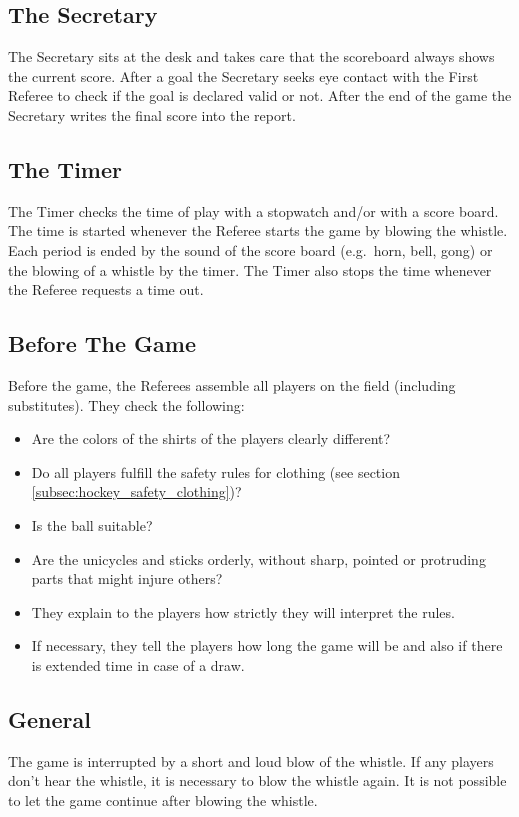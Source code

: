\subsection{The Secretary}
The Secretary sits at the desk and takes care that the scoreboard always shows the current score.
After a goal the Secretary seeks eye contact with the First Referee to check if the goal is declared valid or not.
After the end of the game the Secretary writes the final score into the report.

\subsection{The Timer}
The Timer checks the time of play with a stopwatch and/or with a score board.
The time is started whenever the Referee starts the game by blowing the whistle.
Each period is ended by the sound of the score board (e.g.\ horn, bell, gong) or the blowing of a whistle by the timer.
The Timer also stops the time whenever the Referee requests a time out.

\subsection{Before The Game}
Before the game, the Referees assemble all players on the field (including substitutes).
They check the following:
\begin{itemize}
\item Are the colors of the shirts of the players clearly different?
\item Do all players fulfill the safety rules for clothing (see section \ref{subsec:hockey_safety_clothing})?
\item Is the ball suitable?
\item Are the unicycles and sticks orderly, without sharp, pointed or protruding parts that might injure others?
\item They explain to the players how strictly they will interpret the rules.
\item If necessary, they tell the players how long the game will be and also if there is extended time in case of a draw.
\end{itemize}

\subsection{General}
The game is interrupted by a short and loud blow of the whistle.
If any players don't hear the whistle, it is necessary to blow the whistle again.
It is not possible to let the game continue after blowing the whistle.

